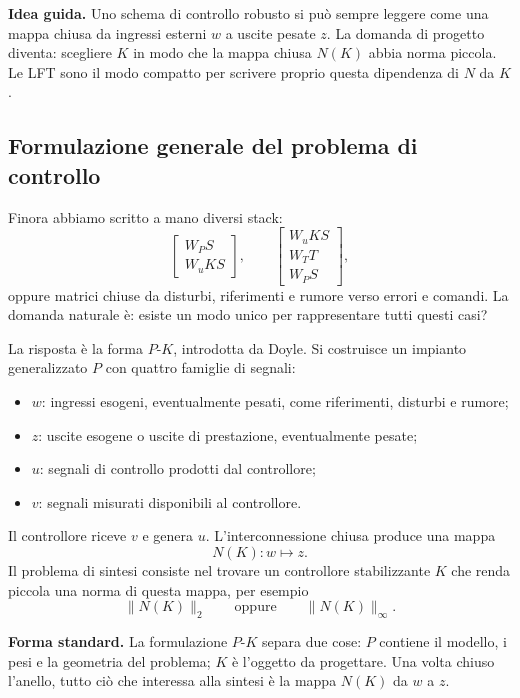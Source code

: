 \documentclass[11pt,a4paper]{article}
\begin{document}
\begin{keybox}
\textbf{Idea guida.} Uno schema di controllo robusto si pu\`o sempre leggere come una mappa chiusa da ingressi esterni $w$ a uscite pesate $z$. La domanda di progetto diventa: scegliere $K$ in modo che la mappa chiusa $N(K)$ abbia norma piccola. Le LFT sono il modo compatto per scrivere proprio questa dipendenza di $N$ da $K$.
\end{keybox}

\subsection{Formulazione generale del problema di controllo}

Finora abbiamo scritto a mano diversi stack:
$$
\begin{bmatrix}
W_P S\\
W_uKS
\end{bmatrix},
\qquad
\begin{bmatrix}
W_uKS\\
W_TT\\
W_PS
\end{bmatrix},
$$
oppure matrici chiuse da disturbi, riferimenti e rumore verso errori e comandi. La domanda naturale \`e: esiste un modo unico per rappresentare tutti questi casi?

La risposta \`e la forma $P$-$K$, introdotta da Doyle. Si costruisce un impianto generalizzato $P$ con quattro famiglie di segnali:
\begin{itemize}
    \item $w$: ingressi esogeni, eventualmente pesati, come riferimenti, disturbi e rumore;
    \item $z$: uscite esogene o uscite di prestazione, eventualmente pesate;
    \item $u$: segnali di controllo prodotti dal controllore;
    \item $v$: segnali misurati disponibili al controllore.
\end{itemize}
Il controllore riceve $v$ e genera $u$. L'interconnessione chiusa produce una mappa
$$
N(K):w\mapsto z.
$$
Il problema di sintesi consiste nel trovare un controllore stabilizzante $K$ che renda piccola una norma di questa mappa, per esempio
$$
\|N(K)\|_2
\qquad\text{oppure}\qquad
\|N(K)\|_\infty.
$$

\begin{focusbox}
\textbf{Forma standard.} La formulazione $P$-$K$ separa due cose: $P$ contiene il modello, i pesi e la geometria del problema; $K$ \`e l'oggetto da progettare. Una volta chiuso l'anello, tutto ci\`o che interessa alla sintesi \`e la mappa $N(K)$ da $w$ a $z$.
\end{focusbox}
\end{document}

